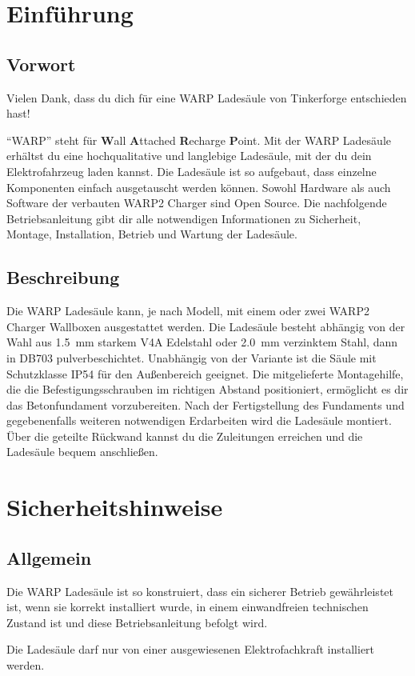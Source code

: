 \documentclass[a4paper,10pt]{article}
\newcommand{\hint}[1]{\begin{tcolorbox}[colback=boxgray,colframe=black,coltext=
white,title=Hinweis]#1\end{tcolorbox}}
\begin{document}
\begin{multicols*}{2}
	\tableofcontents \section{Einführung}
	\subsection{Vorwort} Vielen Dank, dass du
	dich für eine WARP Ladesäule von Tinkerforge entschieden hast!

	\enquote{WARP} steht
	für \textbf{W}all \textbf{A}ttached
	\textbf{R}echarge \textbf{P}oint. Mit der WARP Ladesäule
	erhältst du eine hochqualitative und langlebige Ladesäule, mit der du dein
	Elektrofahrzeug laden kannst. Die Ladesäule ist so aufgebaut, dass
	einzelne Komponenten einfach ausgetauscht werden können. Sowohl Hardware als
	auch Software der verbauten WARP2 Charger sind Open Source. Die nachfolgende Betriebsanleitung gibt dir	alle notwendigen Informationen zu Sicherheit, Montage, Installation, Betrieb
	und Wartung der Ladesäule.

	\subsection{Beschreibung}

	Die WARP Ladesäule kann, je nach Modell, mit einem oder zwei WARP2 Charger Wallboxen
	ausgestattet werden. Die Ladesäule besteht abhängig von der Wahl aus
	\SI{1.5}{\milli\meter} starkem V4A Edelstahl oder \SI{2.0}{\milli\meter}
	verzinktem Stahl, dann in DB703 pulverbeschichtet. Unabhängig von der Variante ist
	die Säule mit Schutzklasse IP54 für den
	Außenbereich geeignet. Die mitgelieferte Montagehilfe, die die Befestigungsschrauben im
	richtigen Abstand positioniert, ermöglicht es dir das Betonfundament
	vorzubereiten.
	Nach der Fertigstellung des Fundaments und gegebenenfalls weiteren
	notwendigen Erdarbeiten wird die Ladesäule montiert.
	Über die geteilte Rückwand kannst du
	die Zuleitungen erreichen und die Ladesäule bequem anschließen. 
\vspace{-0.2cm}
	\section{Sicherheitshinweise}
\vspace{-0.2cm}
	\subsection{Allgemein}
	Die WARP Ladesäule ist so konstruiert, dass ein sicherer Betrieb gewährleistet ist,
	wenn sie korrekt installiert wurde, in einem einwandfreien technischen Zustand
	ist und diese Betriebsanleitung befolgt wird. \hint{Die Ladesäule darf nur von einer ausgewiesenen Elektrofachkraft installiert
		werden.}
\vspace{-0.2cm}

\end{multicols*}
\end{document}
